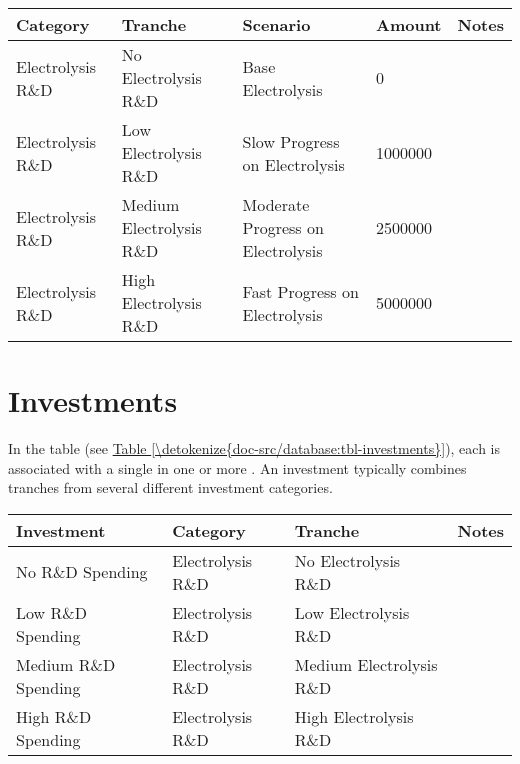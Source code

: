 \documentclass[letterpaper,10pt,english]{sphinxmanual}
\begin{document}
\begin{savenotes}\sphinxattablestart
\centering
{}
\sphinxthecaptionisattop
{}\label{\detokenize{doc-src/database:table-6}}\label{\detokenize{doc-src/database:tbl-tranches}}
\sphinxaftertopcaption
\begin{tabulary}{\linewidth}[t]{|T|T|T|T|T|}
\hline
\sphinxstyletheadfamily 
Category
&\sphinxstyletheadfamily 
Tranche
&\sphinxstyletheadfamily 
Scenario
&\sphinxstyletheadfamily 
Amount
&\sphinxstyletheadfamily 
Notes
\\
\hline
Electrolysis R\&D
&
No Electrolysis R\&D
&
Base Electrolysis
&
0
&\\
\hline
Electrolysis R\&D
&
Low Electrolysis R\&D
&
Slow Progress on Electrolysis
&
1000000
&\\
\hline
Electrolysis R\&D
&
Medium Electrolysis R\&D
&
Moderate Progress on Electrolysis
&
2500000
&\\
\hline
Electrolysis R\&D
&
High Electrolysis R\&D
&
Fast Progress on Electrolysis
&
5000000
&\\
\hline
\end{tabulary}
\par
\sphinxattableend\end{savenotes}


\section{Investments}
\label{\detokenize{doc-src/database:investments}}
In the  table (see \hyperref[\detokenize{doc-src/database:tbl-investments}]{Table \ref{\detokenize{doc-src/database:tbl-investments}}}), each 
is associated with a single  in one or more . An
investment typically combines tranches from several different investment
categories.


\begin{savenotes}\sphinxattablestart
\centering
{}
\sphinxthecaptionisattop
{}\label{\detokenize{doc-src/database:table-7}}\label{\detokenize{doc-src/database:tbl-investments}}
\sphinxaftertopcaption
\begin{tabulary}{\linewidth}[t]{|T|T|T|T|}
\hline
\sphinxstyletheadfamily 
Investment
&\sphinxstyletheadfamily 
Category
&\sphinxstyletheadfamily 
Tranche
&\sphinxstyletheadfamily 
Notes
\\
\hline
No R\&D Spending
&
Electrolysis R\&D
&
No Electrolysis R\&D
&\\
\hline
Low R\&D Spending
&
Electrolysis R\&D
&
Low Electrolysis R\&D
&\\
\hline
Medium R\&D Spending
&
Electrolysis R\&D
&
Medium Electrolysis R\&D
&\\
\hline
High R\&D Spending
&
Electrolysis R\&D
&
High Electrolysis R\&D
&\\
\hline
\end{tabulary}
\par
\sphinxattableend\end{savenotes}
\end{document}
